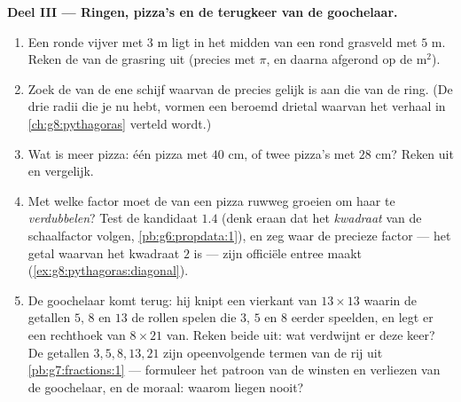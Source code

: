 \begin{problem}[{Weekendopgave --- een beroemd ``bewijs'' dat $64 = 65$, ontmaskerd
met oppervlaktes en hellingen, met pizza's en ringen als nagerecht}]
\medskip
\noindent\textbf{Deel III --- Ringen, pizza's en de terugkeer van de goochelaar.}
\begin{enumerate}[resume]
  \item Een ronde vijver met  $3$ m ligt in het midden van een rond grasveld met
         $5$ m. Reken de  van de grasring uit (precies met $\pi$, en
        daarna afgerond op de m$^2$).
  \item Zoek de  van de ene schijf waarvan de  precies gelijk is aan
        die van de ring. (De drie radii die je nu hebt, vormen een beroemd drietal
        waarvan het verhaal in \cref{ch:g8:pythagoras} verteld wordt.)
  \item Wat is meer pizza: één pizza met  $40$ cm, of twee pizza's met
         $28$ cm? Reken uit en vergelijk.
  \item Met welke factor moet de  van een pizza ruwweg groeien om haar
         te \emph{verdubbelen}? Test de kandidaat $1.4$ (denk eraan dat
         het \emph{kwadraat} van de schaalfactor volgen,
        \cref{pb:g6:propdata:1}), en zeg waar de precieze factor --- het getal
        waarvan het kwadraat $2$ is --- zijn officiële entree maakt
        (\cref{ex:g8:pythagoras:diagonal}).
  \item De goochelaar komt terug: hij knipt een vierkant van $13 \times 13$ waarin de
        getallen $5$, $8$ en $13$ de rollen spelen die $3$, $5$ en $8$ eerder speelden,
        en legt er een rechthoek van $8 \times 21$ van. Reken beide  uit:
        wat verdwijnt er deze keer? De getallen $3, 5, 8, 13, 21$ zijn opeenvolgende
        termen van de rij uit \cref{pb:g7:fractions:1} --- formuleer het patroon van
        de winsten en verliezen van de goochelaar, en de moraal: waarom liegen
         nooit?
\end{enumerate}
\end{problem}
